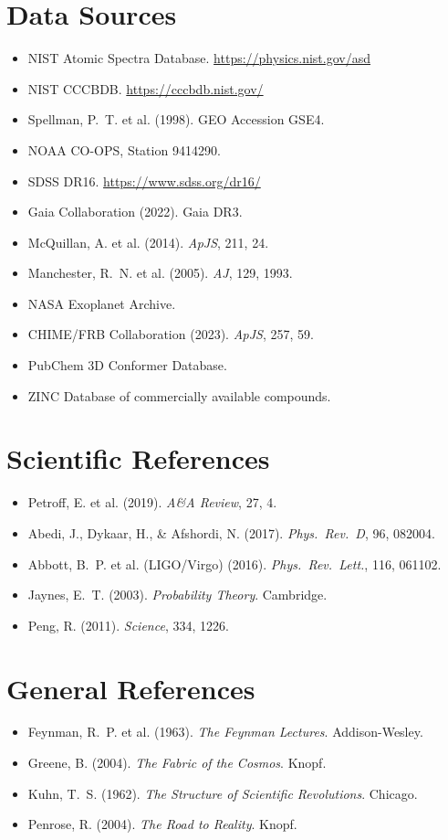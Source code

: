 \documentclass[11pt, letterpaper, openany]{book}
\begin{document}
\section*{Data Sources}
\begin{itemize}
    \item NIST Atomic Spectra Database. \url{https://physics.nist.gov/asd}
    \item NIST CCCBDB. \url{https://cccbdb.nist.gov/}
    \item Spellman, P.~T. et al. (1998). GEO Accession GSE4.
    \item NOAA CO-OPS, Station 9414290.
    \item SDSS DR16. \url{https://www.sdss.org/dr16/}
    \item Gaia Collaboration (2022). Gaia DR3.
    \item McQuillan, A. et al. (2014). \textit{ApJS}, 211, 24.
    \item Manchester, R.~N. et al. (2005). \textit{AJ}, 129, 1993.
    \item NASA Exoplanet Archive.
    \item CHIME/FRB Collaboration (2023). \textit{ApJS}, 257, 59.
    \item PubChem 3D Conformer Database.
    \item ZINC Database of commercially available compounds.
\end{itemize}

\section*{Scientific References}
\begin{itemize}
    \item Petroff, E. et al. (2019). \textit{A\&A Review}, 27, 4.
    \item Abedi, J., Dykaar, H., \& Afshordi, N. (2017). \textit{Phys.\ Rev.\ D}, 96, 082004.
    \item Abbott, B.~P. et al. (LIGO/Virgo) (2016). \textit{Phys.\ Rev.\ Lett.}, 116, 061102.
    \item Jaynes, E.~T. (2003). \textit{Probability Theory}. Cambridge.
    \item Peng, R. (2011). \textit{Science}, 334, 1226.
\end{itemize}

\section*{General References}
\begin{itemize}
    \item Feynman, R.~P. et al. (1963). \textit{The Feynman Lectures}. Addison-Wesley.
    \item Greene, B. (2004). \textit{The Fabric of the Cosmos}. Knopf.
    \item Kuhn, T.~S. (1962). \textit{The Structure of Scientific Revolutions}. Chicago.
    \item Penrose, R. (2004). \textit{The Road to Reality}. Knopf.
\end{itemize}
\end{document}
